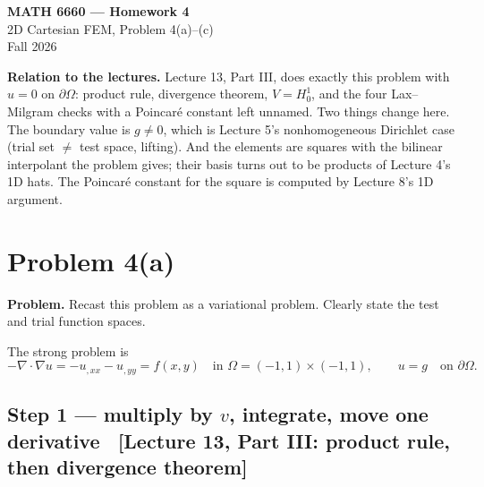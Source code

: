 \documentclass[11pt]{article}
\newcommand{\Om}{\Omega}
\newcommand{\dOm}{\partial\Omega}
\newcommand{\grad}{\nabla}
\newcommand{\src}[1]{{\small\color{black!55}\textsf{[#1]}}}
\begin{document}
\begin{center}
  {\large\bfseries MATH 6660 --- Homework 4}\\[2pt]
  {\normalsize 2D Cartesian FEM, Problem 4(a)--(c)}\\[2pt]
  {\small Fall 2026}
\end{center}

\vspace{4pt}

{\small\color{black!60}
\textbf{Relation to the lectures.}  Lecture 13, Part III, does exactly this
problem with $u=0$ on $\dOm$: product rule, divergence theorem, $V=H^{1}_{0}$,
and the four Lax--Milgram checks with a Poincar\'e constant left unnamed.  Two
things change here.  The boundary value is $g\neq0$, which is Lecture 5's
nonhomogeneous Dirichlet case (trial set $\neq$ test space, lifting).  And the
elements are squares with the bilinear interpolant the problem gives; their
basis turns out to be products of Lecture 4's 1D hats.  The Poincar\'e
constant for the square is computed by Lecture 8's 1D argument.}

\vspace{4pt}

\section*{Problem 4(a)}

\textbf{Problem.} Recast this problem as a variational problem.  Clearly state
the test and trial function spaces.

\medskip
The strong problem is
\begin{equation}\label{eq:pde}
  -\grad\cdot\grad u=-u_{,xx}-u_{,yy}=f(x,y)\quad\text{in } \Om=(-1,1)\times(-1,1),
  \qquad u=g\quad\text{on } \dOm .
\end{equation}

\subsection*{Step 1 --- multiply by $v$, integrate, move one derivative
  \ \src{Lecture 13, Part III: product rule, then divergence theorem}}
\end{document}
